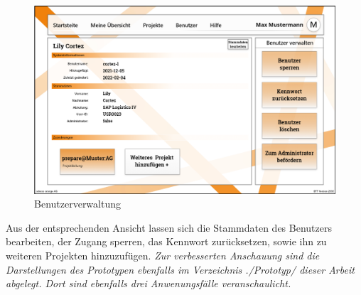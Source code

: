 \begin{figure}[h!]
    \centering
    \includegraphics[scale=0.4]{./Prototyp/043_Benutzer verwalten.png}
    \caption[Prototyp: Benutzerverwaltung]{Benutzerverwaltung}
    \label{fig:Benutzerverwaltung}
\end{figure}
Aus der entsprechenden Ansicht lassen sich die Stammdaten des Benutzers bearbeiten, der Zugang sperren, das Kennwort zurücksetzen, sowie ihn zu weiteren Projekten hinzuzufügen.
\vspace{1em}
\emph{Zur verbesserten Anschauung sind die Darstellungen des Prototypen ebenfalls im Verzeichnis ./Prototyp/ dieser Arbeit abgelegt. Dort sind ebenfalls drei Anwenungsfälle veranschaulicht.}\\